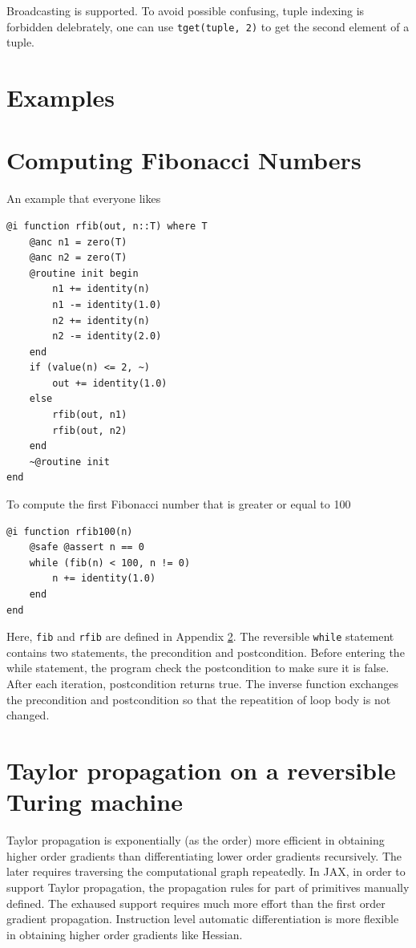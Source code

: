 \documentclass[aps,twocolumn,longbibliography,english,superscriptaddress,prr]{revtex4-1}
\newcommand{\<}{\langle}
\renewcommand{\>}{\rangle}
\newcommand{\App}[1]{Appendix \ref{#1}}
\theoremstyle{definition}\newtheorem{definition}{\textit{Definition}}
\begin{document}
Broadcasting is supported. To avoid possible confusing, tuple indexing is forbidden delebrately, one can use \texttt{tget(tuple, 2)} to get the second element of a tuple.

\section{Examples}

\section{Computing Fibonacci Numbers}\label{sec:fib}
An example that everyone likes

\begin{minipage}{.44\textwidth}
\begin{lstlisting}
@i function rfib(out, n::T) where T
    @anc n1 = zero(T)
    @anc n2 = zero(T)
    @routine init begin
        n1 += identity(n)
        n1 -= identity(1.0)
        n2 += identity(n)
        n2 -= identity(2.0)
    end
    if (value(n) <= 2, ~)
        out += identity(1.0)
    else
        rfib(out, n1)
        rfib(out, n2)
    end
    ~@routine init
end
\end{lstlisting}
\end{minipage}

To compute the first Fibonacci number that is greater or equal to 100

\begin{minipage}{.44\textwidth}
\begin{lstlisting}
@i function rfib100(n)
    @safe @assert n == 0
    while (fib(n) < 100, n != 0)
        n += identity(1.0)
    end
end
\end{lstlisting}
\end{minipage}

Here, \texttt{fib} and \texttt{rfib} are defined in \App{sec:fib}.
The reversible \texttt{while} statement contains two statements, the precondition and postcondition.
Before entering the while statement, the program check the postcondition to make sure it is false.
After each iteration, postcondition returns true. The inverse function exchanges the precondition and postcondition so that the repeatition of loop body is not changed.

\section{Taylor propagation on a reversible Turing machine}
Taylor propagation is exponentially (as the order) more efficient in obtaining higher order gradients than differentiating lower order gradients recursively.
The later requires traversing the computational graph repeatedly.
In JAX, in order to support Taylor propagation, the propagation rules for part of primitives manually defined.
The exhaused support requires much more effort than the first order gradient propagation.
Instruction level automatic differentiation is more flexible in obtaining higher order gradients like Hessian.
\end{document}
